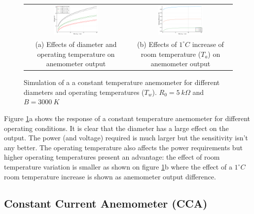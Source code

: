 \documentclass[10pt,fleqn,a4paper,twoside]{article}
\begin{document}
\begin{figure}[h!]
  \centering
  \begin{tabular}{cc}
    \includegraphics[width=0.45\textwidth]{../../figures/CTA-Eo.pdf} & 
    \includegraphics[width=0.45\textwidth]{../../figures/CTA-dt.pdf} \\
    \parbox{0.4\textwidth}{\footnotesize (a) Effects of diameter and operating temperature on anemometer output} & \parbox{0.4\textwidth}{\footnotesize (b) Effects of $1^\circ C$ increase of room temperature ($T_a$) on anemometer output}\\
  \end{tabular}
  \vspace{0.4cm}
\caption{Simulation of a  a constant temperature anemometer for different diameters and operating temperatures ($T_w$). $R_0 = 5\:k\Omega$ and $B = 3000\:K$}
\label{fig:cta1}
\end{figure}

Figure \ref{fig:cta1}a shows the response of a constant temperature anemometer for different operating conditions. It is clear that the diameter has a large effect on the output. The power (and voltage) required is much larger but the sensitivity isn't any better. The operating temperature also affects the power requirements but higher operating temperatures present an advantage: the effect of room temperature variation is smaller as shown on figure \ref{fig:cta1}b where the effect of a $1^\circ C$ room temperature increase is shown as anemometer output difference.

\subsection{Constant Current Anemometer (CCA)}
\end{document}
